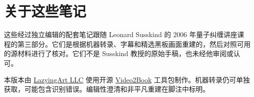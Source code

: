 \documentclass[11pt,oneside]{book}
\begin{document}
\frontmatter
\hypersetup{pageanchor=false}

\hypersetup{pageanchor=true}

\clearpage
\chapter*{关于这些笔记}
这些经过独立编辑的配套笔记跟随 Leonard Susskind 的 2006 年量子纠缠讲座课程的第三部分。它们是根据机器转录、字幕和精选黑板画面重建的，然后对照可用的源材料进行了核对。它们不是 Susskind 教授的原始手稿，也未经他审阅或认可。

本版本由 \href{https://lazying.art}{LazyingArt LLC} 使用开源 \href{https://github.com/lachlanchen/Video2Book}{Video2Book} 工具包制作。机器转录仍可单独获取，可能包含识别错误。编辑性澄清和非平凡重建在脚注中标明。
\clearpage
\tableofcontents
\mainmatter








\end{document}
